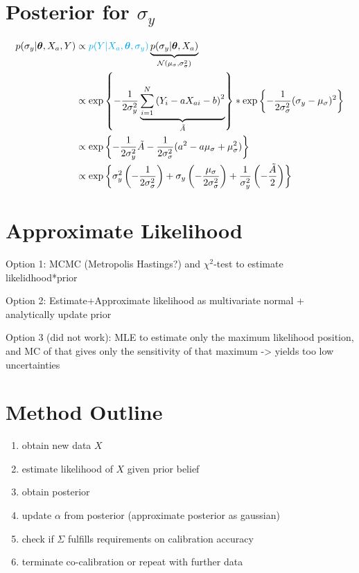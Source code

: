 \documentclass[10pt]{article}
\renewcommand{\vec}[1]{\boldsymbol{#1}}
\newcommand{\mat}[1]{#1}
\begin{document}
    
    \section{Posterior for $\sigma_y$}
    \begin{align}
        p(\sigma_y | \vec{\theta}, X_a, Y) &\propto {\color{cyan} p(Y | X_a, \vec{\theta}, \sigma_y)} \underbrace{p(\sigma_y | \vec{\theta}, X_a)}_{\mathcal{N}(\mu_{\sigma}, \sigma_{\sigma}^2)} \\
        &\propto \exp\left\{ - \frac{1}{2\sigma_y^2} \underbrace{\sum_{i=1}^N \left( Y_i - a X_{ai} - b \right)^2}_{\tilde{A}} \right\} * \exp\left\{ - \frac{1}{2\sigma_{\sigma}^2} ( \sigma_y - \mu_{\sigma} )^2 \right\} \\
        &\propto \exp\left\{ - \frac{1}{2\sigma_y^2} \tilde{A} - \frac{1}{2\sigma_{\sigma}^2} ( a^2 - a \mu_{\sigma} + \mu_{\sigma}^2 ) \right\} \\
        &\propto \exp\left\{ \sigma_y^2 \left( - \frac{1}{2\sigma_{\sigma}^2} \right) + \sigma_y \left( -  \frac{\mu_{\sigma}}{2\sigma_{\sigma}^2}\right) + \frac{1}{\sigma_y^2} \left( - \frac{\tilde{A}}{2} \right) \right\} 
    \end{align}
    
    
    \section{Approximate Likelihood}
    Option 1: MCMC (Metropolis Hastings?) and $\chi^2$-test to estimate likelidhood*prior
    
    Option 2: Estimate+Approximate likelihood as multivariate normal + analytically update prior
    
    Option 3 (did not work): MLE to estimate only the maximum likelihood position, and MC of that gives only the sensitivity of that maximum -> yields too low uncertainties
    
    \section{Method Outline}
    \begin{enumerate}
        \item obtain new data $X$
        \item estimate likelihood of $X$ given prior belief
        \item obtain posterior
        \item update $\alpha$ from posterior (approximate posterior as gaussian)
        \item check if $\mat{\Sigma}$ fulfills requirements on calibration accuracy
        \item terminate co-calibration or repeat with further data
    \end{enumerate}
    
    
    
    
\end{document}
